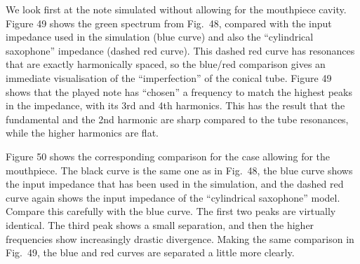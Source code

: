 
  We look first at the note simulated without allowing for the mouthpiece 
  cavity. Figure 49 shows the green spectrum from Fig.\ 48, compared with the 
  input impedance used in the simulation (blue curve) and also the 
  ``cylindrical saxophone'' impedance (dashed red curve). This dashed red curve 
  has resonances that are exactly harmonically spaced, so the blue/red 
  comparison gives an immediate visualisation of the “imperfection” of the 
  conical tube. Figure 49 shows that the played note has ``chosen'' a frequency 
  to match the highest peaks in the impedance, with its 3rd and 4th harmonics. 
  This has the result that the fundamental and the 2nd harmonic are sharp 
  compared to the tube resonances, while the higher harmonics are flat. 


  Figure 50 shows the corresponding comparison for the case allowing for the 
  mouthpiece. The black curve is the same one as in Fig.\ 48, the blue curve 
  shows the input impedance that has been used in the simulation, and the 
  dashed red curve again shows the input impedance of the “cylindrical 
  saxophone” model. Compare this carefully with the blue curve. The first two 
  peaks are virtually identical. The third peak shows a small separation, and 
  then the higher frequencies show increasingly drastic divergence. Making the 
  same comparison in Fig.\ 49, the blue and red curves are separated a little 
  more clearly. 


